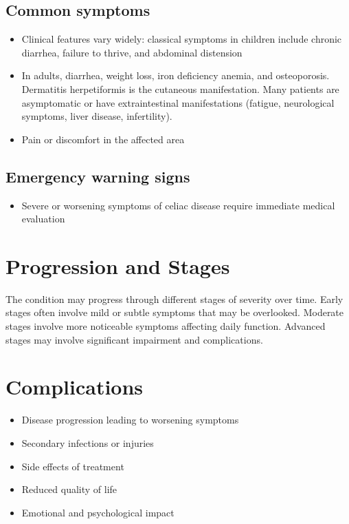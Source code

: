 \subsection{Common symptoms}
\begin{itemize}[noitemsep]
  \item Clinical features vary widely: classical symptoms in children include chronic diarrhea, failure to thrive, and abdominal distension
  \item In adults, diarrhea, weight loss, iron deficiency anemia, and osteoporosis. Dermatitis herpetiformis is the cutaneous manifestation. Many patients are asymptomatic or have extraintestinal manifestations (fatigue, neurological symptoms, liver disease, infertility).
  \item Pain or discomfort in the affected area
  \end{itemize}

\subsection{Emergency warning signs}
\begin{itemize}[noitemsep]
  \item Severe or worsening symptoms of celiac disease require immediate medical evaluation
\end{itemize}
\section{Progression and Stages}
The condition may progress through different stages of severity over time. Early stages often involve mild or subtle symptoms that may be overlooked. Moderate stages involve more noticeable symptoms affecting daily function. Advanced stages may involve significant impairment and complications.
\section{Complications}
\begin{itemize}[noitemsep]
  \item Disease progression leading to worsening symptoms
  \item Secondary infections or injuries
  \item Side effects of treatment
  \item Reduced quality of life
  \item Emotional and psychological impact
\end{itemize}
